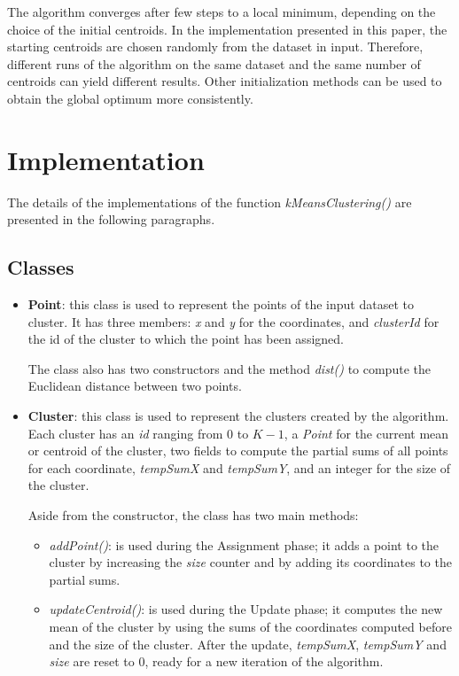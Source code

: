 \documentclass[10pt,twocolumn,letterpaper]{article}
\begin{document}
The algorithm converges after few steps to a local minimum, depending on the choice of the initial centroids. In the implementation presented in this paper, the starting centroids are chosen randomly from the dataset in input. Therefore, different runs of the algorithm on the same dataset and the same number of centroids can yield different results. Other initialization methods can be used to obtain the global optimum more consistently.


\section{Implementation}
The details of the implementations of the function \textit{kMeansClustering()} are presented in the following paragraphs.

\subsection{Classes}
\begin{itemize}
	\item \textbf{Point}: this class is used to represent the points of the input dataset to cluster. It has three members: \textit{x} and \textit{y} for the coordinates, and \textit{clusterId} for the id of the cluster to which the point has been assigned. 
	
	The class also has two constructors and the method \textit{dist()} to compute the Euclidean distance between two points.
	
	\item \textbf{Cluster}: this class is used to represent the clusters created by the algorithm. Each cluster has an \textit{id} ranging from 0 to $K - 1$, a \textit{Point} for the current mean or centroid of the cluster, two fields to compute the partial sums of all points for each coordinate, \textit{tempSumX} and \textit{tempSumY}, and an integer for the size of the cluster.
	
	Aside from the constructor, the class has two main methods:
	\begin{itemize}
		\item \textit{addPoint()}: is used during the Assignment phase; it adds a point to the cluster by increasing the \textit{size} counter and by adding its coordinates to the partial sums.
		\item \textit{updateCentroid()}: is used during the Update phase; it computes the new mean of the cluster by using the sums of the coordinates computed before and the size of the cluster. After the update, \textit{tempSumX}, \textit{tempSumY} and \textit{size} are reset to 0, ready for a new iteration of the algorithm.
	\end{itemize}
\end{itemize}
\end{document}
